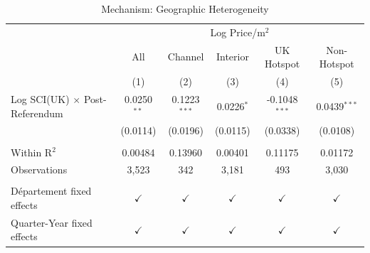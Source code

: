 
\begin{table}[htbp]
   \caption{\label{tab:geographic} Mechanism: Geographic Heterogeneity}
   \bigskip
   \centering
   \begin{tabular}{lccccc}
      \toprule
       & \multicolumn{5}{c}{Log Price/m$^2$}\\
                                            & All           & Channel        & Interior      & UK Hotspot      & Non-Hotspot \\   
                                            & (1)           & (2)            & (3)           & (4)             & (5)\\  
      \midrule 
      Log SCI(UK) $\times$ Post-Referendum  & 0.0250$^{**}$ & 0.1223$^{***}$ & 0.0226$^{*}$  & -0.1048$^{***}$ & 0.0439$^{***}$\\   
                                            & (0.0114)      & (0.0196)       & (0.0115)      & (0.0338)        & (0.0108)\\   
       \\
      Within R$^2$                          & 0.00484       & 0.13960        & 0.00401       & 0.11175         & 0.01172\\  
      Observations                          & 3,523         & 342            & 3,181         & 493             & 3,030\\  
       \\
      Département fixed effects             & $\checkmark$  & $\checkmark$   & $\checkmark$  & $\checkmark$    & $\checkmark$\\   
      Quarter-Year fixed effects            & $\checkmark$  & $\checkmark$   & $\checkmark$  & $\checkmark$    & $\checkmark$\\   
      \bottomrule
   \end{tabular}
\end{table}


